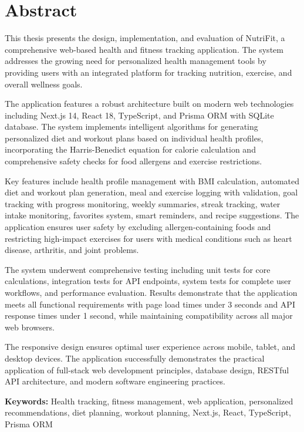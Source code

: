 \chapter*{Abstract}

This thesis presents the design, implementation, and evaluation of NutriFit, a comprehensive web-based health and fitness tracking application. The system addresses the growing need for personalized health management tools by providing users with an integrated platform for tracking nutrition, exercise, and overall wellness goals.

The application features a robust architecture built on modern web technologies including Next.js 14, React 18, TypeScript, and Prisma ORM with SQLite database. The system implements intelligent algorithms for generating personalized diet and workout plans based on individual health profiles, incorporating the Harris-Benedict equation for calorie calculation and comprehensive safety checks for food allergens and exercise restrictions.

Key features include health profile management with BMI calculation, automated diet and workout plan generation, meal and exercise logging with validation, goal tracking with progress monitoring, weekly summaries, streak tracking, water intake monitoring, favorites system, smart reminders, and recipe suggestions. The application ensures user safety by excluding allergen-containing foods and restricting high-impact exercises for users with medical conditions such as heart disease, arthritis, and joint problems.

The system underwent comprehensive testing including unit tests for core calculations, integration tests for API endpoints, system tests for complete user workflows, and performance evaluation. Results demonstrate that the application meets all functional requirements with page load times under 3 seconds and API response times under 1 second, while maintaining compatibility across all major web browsers.

The responsive design ensures optimal user experience across mobile, tablet, and desktop devices. The application successfully demonstrates the practical application of full-stack web development principles, database design, RESTful API architecture, and modern software engineering practices.

\textbf{Keywords:} Health tracking, fitness management, web application, personalized recommendations, diet planning, workout planning, Next.js, React, TypeScript, Prisma ORM
